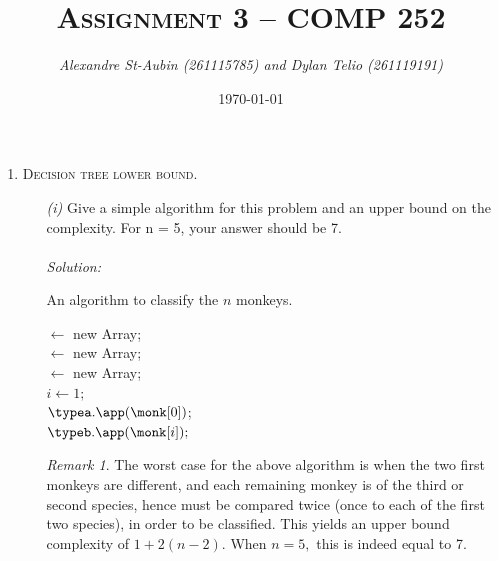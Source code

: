 \documentclass[12pt]{article}
\title{\textsc{Assignment 3 -- COMP 252}}
\author{\it Alexandre St-Aubin (261115785) and Dylan Telio (261119191)}
\date{\today}
\theoremstyle{definition}
\theoremstyle{remark}
\newtheorem*{remark}{Remark}
\newcommand\sol{%
  \\ 
  \\
  \textit{Solution:}\\%
}
\begin{document}
\maketitle 
{}
\begin{enumerate}
  \item \textsc{Decision tree lower bound.}
  \begin{enumerate}
    \item[\it (i)]Give a simple algorithm for this problem and an upper bound on the complexity. For n = 5, your answer should be 7.
    \sol
    \begin{algorithm}
    \caption{An algorithm to classify the $n$ monkeys. }
    \BlankLine
    \typea $\leftarrow$ new Array;  \\ 
    \typeb $\leftarrow$ new Array;  \\ 
    \typec $\leftarrow$ new Array;  \\ 
    $i \leftarrow 1;$\\ 
    $\typea.\app(\monk[0])$;\\
      $\typeb.\app (\monk[i]);$
    \BlankLine 
  \end{algorithm}
    \begin{remark} 
      The worst case for the above algorithm is when the two first monkeys are different, and each remaining monkey is of the third or second species, hence must be compared twice (once to each of the first two species), in order to be classified. This yields an upper bound complexity of $1 + 2(n-2).$ When $n = 5, $ this is indeed equal to 7.
    \end{remark} 
    \newpage

\end{enumerate}
\end{enumerate}
\end{document}
